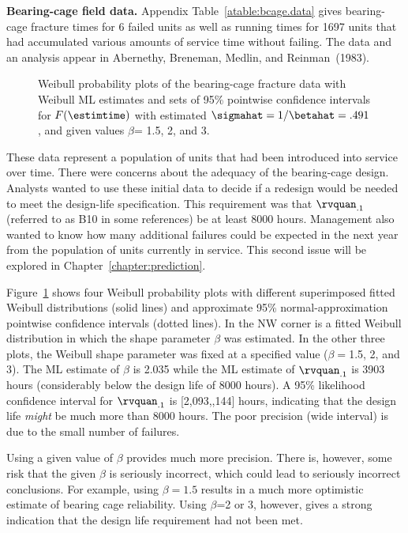\begin{example}
\label{example:bearing.cage}
{\bf Bearing-cage field data.} Appendix
Table~\ref{atable:bcage.data} gives bearing-cage fracture times for
6 failed units as well as running times for 1697 units that had
accumulated various amounts of service time without failing.  The
data and an analysis appear in Abernethy, Breneman, Medlin, and
Reinman~(1983).
\begin{sidewaysfigure}
\caption{Weibull probability plots of the bearing-cage fracture data
with Weibull ML estimates and sets of 95\% pointwise confidence
intervals for $F(\estimtime)$ with estimated
$\sigmahat=1/\betahat=.491$, and given values $\beta$= 1.5,
2, and 3.}
\label{figure:bcage.fix.beta.ps}
\end{sidewaysfigure}
These data represent a population of units that had been introduced
into service over time. There were concerns about the adequacy of the
bearing-cage design.  Analysts wanted to use these initial data to
decide if a redesign would be needed to meet the design-life
specification.  This requirement was that $\rvquan_{.1}$ (referred to
as B10 in some references) be at least 8000 hours.  Management also
wanted to know how many additional failures could be expected in the
next year from the population of units currently in service. This
second issue will be explored in Chapter~\ref{chapter:prediction}.

Figure~\ref{figure:bcage.fix.beta.ps} shows four Weibull probability
plots with different superimposed fitted Weibull distributions (solid
lines) and approximate 95\% normal-approximation pointwise confidence
intervals (dotted lines).  In the NW corner is a fitted Weibull
distribution in which the shape parameter $\beta$ was estimated. In
the other three plots, the Weibull shape parameter was fixed at a
specified value ($\beta=$1.5, 2, and 3). The ML estimate of $\beta$ is
2.035 while the ML estimate of $\rvquan_{.1}$ is 3903 hours
(considerably below the design life of 8000 hours). A 95\% likelihood
confidence interval for $\rvquan_{.1}$ is [2,093,,144] hours,
indicating that the design life {\em might} be much more than 8000
hours.  The poor precision (wide interval) is due to the small number
of failures.

Using a given value of $\beta$ provides much more precision. There is,
however, some risk
that the given $\beta$ is seriously incorrect, which could lead to  
seriously incorrect conclusions.
For example, using $\beta=1.5$ results in a
much more optimistic estimate of bearing cage reliability. Using
$\beta$=2 or 3, however, gives a strong indication that the design
life requirement had not been met.
\end{example}


